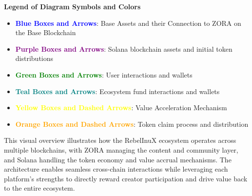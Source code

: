 \documentclass{article}
\begin{document}
\begin{center}
    {\LARGE \color{primaryColor}\textbf{Legend of Diagram Symbols and Colors}}
\end{center}
\begin{multicols}{2}
\begin{itemize}
    \item \textbf{\textcolor{blue}{Blue Boxes and Arrows}}: Base Assets and their Connection to ZORA on the Base Blockchain
    \item \textbf{\textcolor{purple}{Purple Boxes and Arrows}}: Solana blockchain assets and initial token distributions
    \item \textbf{\textcolor{green}{Green Boxes and Arrows}}: User interactions and wallets
\end{itemize}
\columnbreak
\begin{itemize}
    \item \textbf{\textcolor{teal}{Teal Boxes and Arrows}}: Ecosystem fund interactions and wallets
        \item \textbf{\textcolor{yellow}{Yellow Boxes and Dashed Arrows}}: Value Acceleration Mechanism
    \item \textbf{\textcolor{orange}{Orange Boxes and Dashed Arrows}}: Token claim process and distribution
\end{itemize}
\end{multicols}
\vspace{0.5cm}
This visual overview illustrates how the RebelInuX ecosystem operates across multiple blockchains, with ZORA managing the content and community layer, and Solana handling the token economy and value accrual mechanisms. The architecture enables seamless cross-chain interactions while leveraging each platform's strengths to directly reward creator participation and drive value back to the entire ecosystem.
\end{document}
